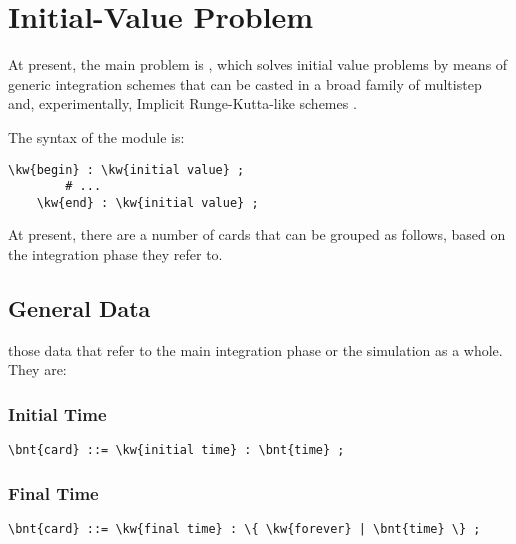 \section{Initial-Value Problem}
\label{sec:IVP}
At present, the main problem is ,
which solves initial value problems
by means of generic integration schemes that can be casted
in a broad family of multistep and, experimentally,
Implicit Runge-Kutta-like schemes
\cite{MASARATI-LANZ-MANTEGAZZA-2001}.

The syntax of the module is:
\begin{Verbatim}[commandchars=\\\{\}]
    \kw{begin} : \kw{initial value} ;
        # ...
    \kw{end} : \kw{initial value} ;
\end{Verbatim}
At present, there are a number of cards that can be grouped as follows, 
based on the integration phase they refer to.

\subsection{General Data}
those data that refer to the main integration phase or the simulation as a
whole. They are:

\subsubsection{Initial Time}
\begin{Verbatim}[commandchars=\\\{\}]
    \bnt{card} ::= \kw{initial time} : \bnt{time} ;
\end{Verbatim}

\subsubsection{Final Time}
\begin{Verbatim}[commandchars=\\\{\}]
    \bnt{card} ::= \kw{final time} : \{ \kw{forever} | \bnt{time} \} ;
\end{Verbatim}


